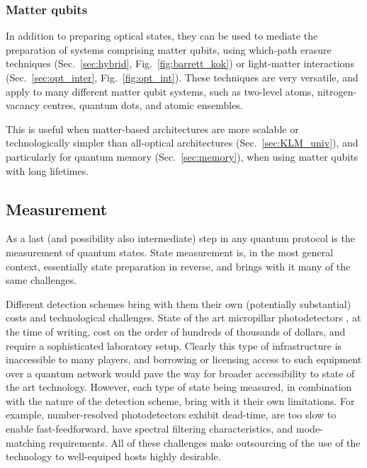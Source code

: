 \documentclass[aps,rmp,twocolumn,amsmath,amssymb,nofootinbib,superscriptaddress,longbibliography,floatfix]{revtex4-1}
\begin{document}
%
%

\subsubsection{Matter qubits}

In addition to preparing optical states, they can be used to mediate the preparation of systems comprising matter qubits, using which-path erasure techniques (Sec.~\ref{sec:hybrid}, Fig.~\ref{fig:barrett_kok}) or light-matter interactions (Sec.~\ref{sec:opt_inter}, Fig.~\ref{fig:opt_int}). These techniques are very versatile, and apply to many different matter qubit systems, such as two-level atoms, nitrogen-vacancy centres, quantum dots, and atomic ensembles.

This is useful when matter-based architectures are more scalable or technologically simpler than all-optical architectures (Sec.~\ref{sec:KLM_univ}), and particularly for quantum memory (Sec.~\ref{sec:memory}), when using matter qubits with long lifetimes.

%
%

\subsection{Measurement}

As a last (and possibility also intermediate) step in any quantum protocol is the measurement of quantum states. State measurement is, in the most general context, essentially state preparation in reverse, and brings with it many of the same challenges.

Different detection schemes bring with them their own (potentially substantial) costs and technological challenges. State of the art micropillar photodetectors \cite{???}, at the time of writing, cost on the order of hundreds of thousands of dollars, and require a sophisticated laboratory setup. Clearly this type of infrastructure is inaccessible to many players, and borrowing or licensing access to such equipment over a quantum network would pave the way for broader accessibility to state of the art technology. However, each type of state being measured, in combination with the nature of the detection scheme, bring with it their own limitations. For example, number-resolved photodetectors exhibit dead-time, are too slow to enable fast-feedforward, have spectral filtering characteristics, and mode-matching requirements. All of these challenges make outsourcing of the use of the technology to well-equiped hosts highly desirable.
\end{document}
